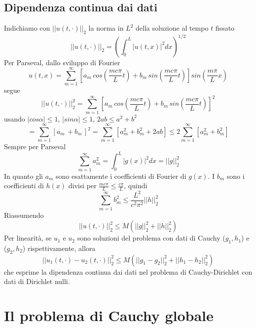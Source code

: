 \subsection{Dipendenza continua dai dati}
Indichiamo con $||u(t, \cdot)||_2$ la norma in $L^2$ della soluzione al tempo
$t$ fissato
\[
	||u(t, \cdot)||_2=
	\left(
	\int_0^L |u(t,x)|^2 dx
	\right)^{1/2}
\]
Per Parseval, dallo sviluppo di Fourier
\[
	u(t,x)= \sum_{m=1}^{\infty} \left[ a_m \, cos \left( \frac{mc\pi}{L} t
\right)
	+ b_m \, sin \left( \frac{mc\pi}{L} t \right) \right]
	 sin \left( \frac{m\pi}{L} x \right)
\]
segue
\[
	||u(t, \cdot)||_2^2 = \sum_{m=1}^{\infty} \left[ a_m \, cos \left(
	\frac{mc\pi}{L} t \right)
	+ b_m \, sin \left( \frac{mc\pi}{L} t \right) \right]^2
\]
usando $|cos \alpha |\leq 1$, $|sin \alpha |\leq 1$, $2ab \leq a^2 + b^2$
\[
	=\sum_{m=1}^{\infty} \left[ a_m \,
	+ b_m \, \right]^2 =
	\sum_{m=1}^{\infty} \left[ a_m^2 + b_m^2 + 2ab \right]
	\leq 2 \sum_{m=1}^{\infty} \left[ a_m^2 + b_m^2 \right]
\]
Sempre per Parseval
\[
	\sum_{m=1}^{\infty} a_m^2 =
	\int_0^L |g(x)|^2 dx = ||g||_2^2
\]
In quanto gli $a_m$ sono esattamente i coefficienti di Fourier di $g(x)$. I
$b_m$ sono i coefficienti di $h(x)$ divisi per $\frac{mc \pi}{L}\leq
\frac{c \pi}{L}$, quindi
\[
	\sum_{m=1}^{\infty} b_m^2 \leq \frac{L^2}{c^2 \pi^2}||h||^2_2
\]
Riassumendo
\[
	||u(t,\cdot)||_2^2 \leq M(||g||_2^2 + ||h||_2^2)
\]
Per linearit\`a, se $u_1$ e $u_2$ sono soluzioni del problema con dati di
Cauchy ($g_1,h_1$) e ($g_2,h_2$) rispettivamente, allora
\[
	||u_1(t,\cdot) - u_2(t,\cdot)||_2^2 \leq M(||g_1 - g_2||_2^2 + ||h_1 -
	h_2||_2^2)
\]
che esprime la dipendenza continua dai dati nel problema di Cauchy-Dirichlet
con dati di Dirichlet nulli.
\section{Il problema di Cauchy globale}
